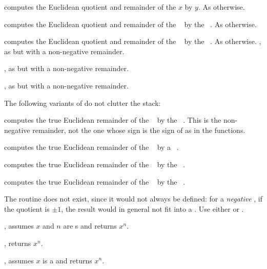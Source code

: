computes the Euclidean quotient and remainder of the $x$ by $y$. As
 otherwise.

 computes the Euclidean quotient
and remainder of the ~ by the ~. As
 otherwise.

 computes the Euclidean quotient
and remainder of the ~ by the ~. As
 otherwise.
\smallskip
{}, as  but with a
non-negative remainder.

, as  but with a
non-negative remainder.

, as  but with a
non-negative remainder.

 The following variants of  do not
clutter the stack:

 computes the true Euclidean
remainder of the ~ by the ~. This is the
non-negative remainder, not the one whose sign is the sign of 
as in the  functions.

 computes the true Euclidean
remainder of the ~ by a ~.

 computes the true Euclidean
remainder of the ~ by the ~.

 computes the true Euclidean
remainder of the ~ by the ~.

The routine  does not exist, since it would not always be
defined: for a \emph{negative} , if the quotient is $\pm1$, the result
 would in general not fit into a . Use either
 or .


, assumes $x$ and $n$ are s and
returns $x^n$.

, returns $x^n$.

, assumes $x$ is a  and returns $x^n$.

